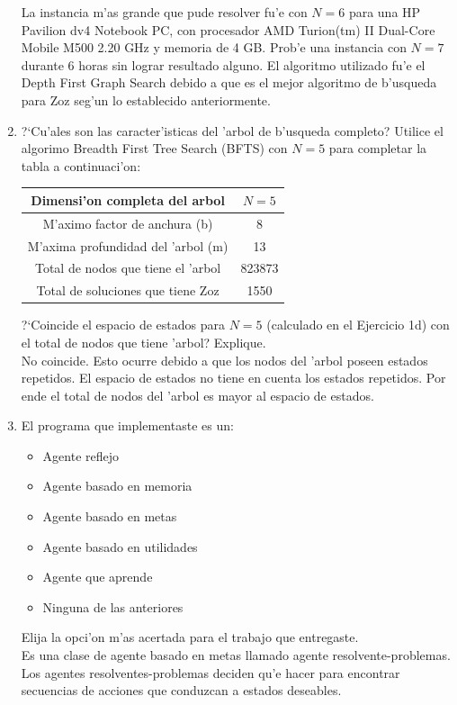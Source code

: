 \documentclass[11pt]{article}
\begin{document}
\begin{enumerate}
La instancia m'as grande que pude resolver fu'e con $N=6$ para una HP Pavilion dv4 Notebook PC, con procesador AMD Turion(tm) II Dual-Core Mobile M500 2.20 GHz y memoria de 4 GB. Prob'e una instancia con $N=7$ durante 6 horas sin lograr resultado alguno. El algoritmo utilizado fu'e el Depth First Graph Search debido a que es el mejor algoritmo de b'usqueda para Zoz seg'un lo establecido anteriormente. \\

\item ?`Cu'ales son las caracter'isticas del 'arbol de b'usqueda completo? Utilice el algorimo Breadth First Tree
Search (BFTS) con $N=5$ para completar la tabla a continuaci'on:

\begin{center}
\begin{tabular}{|c|c|}
\hline	
Dimensi'on completa del arbol & $N=5$ \\ \hline
M'aximo factor de anchura (b) & 8\\ \hline
M'axima profundidad del 'arbol (m) & 13\\ \hline
Total de nodos que tiene el 'arbol & 823873\\ \hline
Total de soluciones que tiene Zoz & 1550\\ \hline
\end{tabular}	
\end{center}

?`Coincide el espacio de estados para $N=5$ (calculado en el Ejercicio 1d) con el total de nodos que tiene 'arbol? Explique. \\

No coincide. Esto ocurre debido a que los nodos del 'arbol poseen estados repetidos. El espacio de estados no tiene en cuenta los estados repetidos. Por ende el total de nodos del 'arbol es mayor al espacio de estados. \\

\item El programa que implementaste es un:
	\begin{itemize}
	\item Agente reflejo
	\item Agente basado en memoria
	\item Agente basado en metas
	\item Agente basado en utilidades
	\item Agente que aprende
	\item Ninguna de las anteriores
	\end{itemize}
	Elija la opci'on m'as acertada para el trabajo que 					entregaste. \\
	
Es una clase de agente basado en metas llamado agente resolvente-problemas. Los agentes resolventes-problemas deciden qu'e hacer para encontrar secuencias de acciones que conduzcan a estados deseables.

\end{enumerate}
\end{document}

